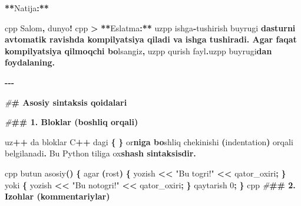 \documentclass[a4paper,11pt,twoside,openright]{book}
\newenvironment{Shaded}{\begin{snugshade}}{\end{snugshade}}
\newcommand{\CharTok}[1]{\textcolor[rgb]{0.31,0.60,0.02}{#1}}
\newcommand{\DecValTok}[1]{\textcolor[rgb]{0.00,0.00,0.81}{#1}}
\newcommand{\ErrorTok}[1]{\textcolor[rgb]{0.64,0.00,0.00}{\textbf{#1}}}
\newcommand{\NormalTok}[1]{#1}
\newcommand{\OperatorTok}[1]{\textcolor[rgb]{0.81,0.36,0.00}{\textbf{#1}}}
\newcommand{\PreprocessorTok}[1]{\textcolor[rgb]{0.56,0.35,0.01}{\textit{#1}}}
\newcommand{\StringTok}[1]{\textcolor[rgb]{0.31,0.60,0.02}{#1}}
\begin{document}
\begin{Shaded}
\begin{Highlighting}[]
\OperatorTok{**}\NormalTok{Natija}\OperatorTok{:**}

\ErrorTok{\textasciigrave{}\textasciigrave{}\textasciigrave{}}\NormalTok{cpp}
\NormalTok{Salom}\OperatorTok{,}\NormalTok{ dunyo}\OperatorTok{!}
\ErrorTok{\textasciigrave{}\textasciigrave{}\textasciigrave{}}\NormalTok{cpp}
\OperatorTok{\textgreater{}} \OperatorTok{**}\NormalTok{Eslatma}\OperatorTok{:**} \ErrorTok{\textasciigrave{}}\NormalTok{uzpp ishga}\OperatorTok{{-}}\NormalTok{tushirish}\ErrorTok{\textasciigrave{}}\NormalTok{ buyrug}\CharTok{\textquotesingle{}i}\ErrorTok{ dasturni avtomatik ravishda kompilyatsiya qiladi va ishga tushiradi. Agar faqat kompilyatsiya qilmoqchi bo}\CharTok{\textquotesingle{}}\NormalTok{lsangiz}\OperatorTok{,} \ErrorTok{\textasciigrave{}}\NormalTok{uzpp qurish fayl}\OperatorTok{.}\NormalTok{uzpp}\ErrorTok{\textasciigrave{}}\NormalTok{ buyrug}\CharTok{\textquotesingle{}i}\ErrorTok{dan foydalaning.}

\OperatorTok{{-}{-}{-}}

\PreprocessorTok{\#}\ErrorTok{\# Asosiy sintaksis qoidalari}

\PreprocessorTok{\#}\ErrorTok{\#\# 1. Bloklar (bo\textquotesingle{}shliq orqali)}

\NormalTok{uz}\OperatorTok{++}\NormalTok{ da bloklar C}\OperatorTok{++}\NormalTok{ dagi }\ErrorTok{\textasciigrave{}}\OperatorTok{\{}\ErrorTok{\textasciigrave{}} \ErrorTok{\textasciigrave{}}\OperatorTok{\}}\ErrorTok{\textasciigrave{}}\NormalTok{ o}\CharTok{\textquotesingle{}r}\ErrorTok{niga bo}\CharTok{\textquotesingle{}}\NormalTok{shliq chekinishi }\OperatorTok{(}\ErrorTok{\textasciigrave{}}\NormalTok{indentation}\ErrorTok{\textasciigrave{}}\OperatorTok{)}\NormalTok{ orqali belgilanadi}\OperatorTok{.}\NormalTok{ Bu Python tiliga o}\CharTok{\textquotesingle{}x}\ErrorTok{shash sintaksisdir.}

\ErrorTok{\textasciigrave{}\textasciigrave{}\textasciigrave{}}\NormalTok{cpp}
\NormalTok{butun asosiy}\OperatorTok{()} \OperatorTok{\{}
\NormalTok{    agar }\OperatorTok{(}\NormalTok{rost}\OperatorTok{)} \OperatorTok{\{}
\NormalTok{        yozish }\OperatorTok{\textless{}\textless{}} \StringTok{"Bu to\textquotesingle{}g\textquotesingle{}ri!"} \OperatorTok{\textless{}\textless{}}\NormalTok{ qator\_oxiri}\OperatorTok{;}
    \OperatorTok{\}}\NormalTok{ yoki }\OperatorTok{\{}
\NormalTok{        yozish }\OperatorTok{\textless{}\textless{}} \StringTok{"Bu noto\textquotesingle{}g\textquotesingle{}ri!"} \OperatorTok{\textless{}\textless{}}\NormalTok{ qator\_oxiri}\OperatorTok{;}
    \OperatorTok{\}}
\NormalTok{    qaytarish }\DecValTok{0}\OperatorTok{;}
\OperatorTok{\}}
\ErrorTok{\textasciigrave{}\textasciigrave{}\textasciigrave{}}\NormalTok{cpp}
\PreprocessorTok{\#}\ErrorTok{\#\# 2. Izohlar (kommentariylar)}


\end{Highlighting}
\end{Shaded}
\end{document}
